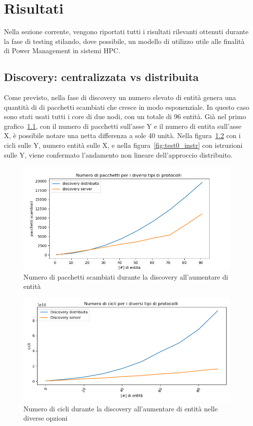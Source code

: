 \chapter{Risultati}%

Nella sezione corrente, vengono riportati tutti i risultati rilevanti ottenuti durante la fase di testing stilando, dove possibile, un modello di utilizzo utile alle finalità di Power Management in sistemi HPC.
\section{Discovery: centralizzata vs distribuita}
Come previsto, nella fase di discovery un numero elevato di entità genera una quantità di di pacchetti scambiati che cresce in modo esponenziale. In questo caso sono stati usati tutti i core di due nodi, con un totale di 96 entità.
Già nel primo grafico~\ref{fig:test0pack}, con il numero di pacchetti sull'asse Y e il numero di entita sull'asse X, è possibile notare una netta differenza a sole 40 unità. Nella figura~\ref{fig:test0cicl} con i cicli sulle Y, numero entità sulle X, e nella figura~\ref{fig:test0_instr} con istruzioni sulle Y, viene confermato l'andamento non lineare dell'approccio distribuito.
\begin{figure}[H]
    \includegraphics[width=\textwidth]{./results/test0_packet.png} 
    \caption{Numero di pacchetti scambiati durante la discovery all'aumentare di entità}\label{fig:test0pack}
\end{figure}
\begin{figure}[H]
    \includegraphics[width=\textwidth]{./results/test0_cicli.png} 
    \caption{Numero di cicli durante la discovery all'aumentare di entità nelle diverse opzioni}\label{fig:test0cicl}
\end{figure}
